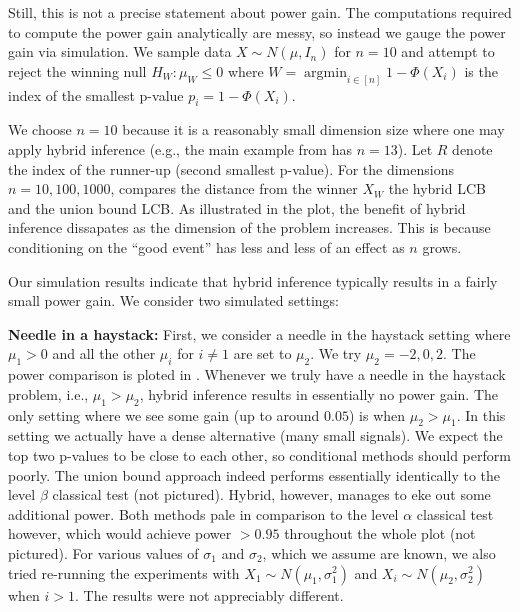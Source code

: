 \documentclass{article}
\DeclareMathOperator*{\argmin}{argmin}
\begin{document}
\begin{appendix}
Still, this is not a precise statement about power gain. The computations required to compute the power gain analytically are messy, so instead we gauge the power gain via simulation. We sample data $X \sim N(\mu, I_n)$ for $n=10$ and attempt to reject the winning null $H_W: \mu_W \leq 0$ where $W = \argmin_{i \in [n]} 1 - \Phi(X_i)$ is the index of the smallest p-value $p_i = 1-\Phi(X_i)$.  

We choose $n=10$ because it is a reasonably small dimension size where one may apply hybrid inference (e.g., the main example from \cite{Andrews2023} has $n=13$). Let $R$ denote the index of the runner-up (second smallest p-value). For the dimensions  $n=10, 100, 1000$,  
compares the distance from the winner $X_W$ the hybrid LCB and the union bound LCB. As illustrated in the plot, the benefit of hybrid inference dissapates as the dimension of the problem increases. This is because conditioning on the ``good event'' has less and less of an effect as $n$ grows. 

Our simulation results indicate that hybrid inference typically results in a fairly small power gain. We consider two simulated settings: \newline 

\noindent \textbf{Needle in a haystack: } First, we consider a needle in the haystack setting where $\mu_1 > 0$ and all the other $\mu_i$ for $ i\neq 1$ are set to $\mu_2$. We try $\mu_2 = -2, 0, 2$. The power comparison is ploted in . Whenever we truly have a needle in the haystack problem, i.e., $\mu_1 > \mu_2$, hybrid inference results in essentially no power gain. The only setting where we see some gain (up to around $0.05$) is when $\mu_2 > \mu_1$. In this setting  we actually have a dense alternative (many small signals). We expect the top two p-values to be close to each other, so conditional methods should perform poorly. The union bound approach indeed performs essentially identically to the level $\beta$ classical test (not pictured). Hybrid, however, manages to eke out some additional power. Both methods pale in comparison to the level $\alpha$ classical test however, which would achieve power $>0.95$ throughout the whole plot (not pictured). For various values of $\sigma_1$ and $\sigma_2$, which we assume are known, we also tried re-running the experiments with  $X_1 \sim N(\mu_1, \sigma_1^2)$ and $X_i \sim N(\mu_2, \sigma_2^2)$ when $i > 1$. The results were not appreciably different.  \newline 


\end{appendix}
\end{document}
